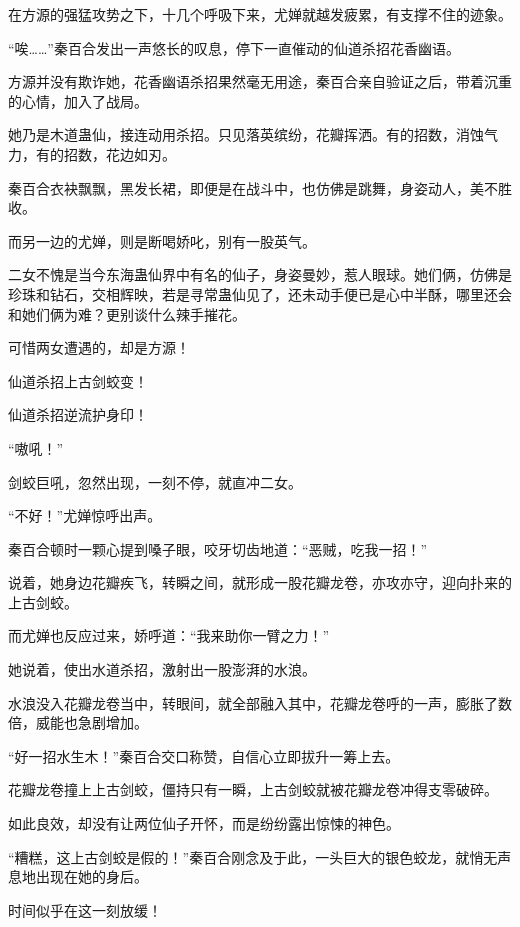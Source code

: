 
\begin{this_body}



在方源的强猛攻势之下，十几个呼吸下来，尤婵就越发疲累，有支撑不住的迹象。

“唉……”秦百合发出一声悠长的叹息，停下一直催动的仙道杀招花香幽语。

方源并没有欺诈她，花香幽语杀招果然毫无用途，秦百合亲自验证之后，带着沉重的心情，加入了战局。

她乃是木道蛊仙，接连动用杀招。只见落英缤纷，花瓣挥洒。有的招数，消蚀气力，有的招数，花边如刃。

秦百合衣袂飘飘，黑发长裙，即便是在战斗中，也仿佛是跳舞，身姿动人，美不胜收。

而另一边的尤婵，则是断喝娇叱，别有一股英气。

二女不愧是当今东海蛊仙界中有名的仙子，身姿曼妙，惹人眼球。她们俩，仿佛是珍珠和钻石，交相辉映，若是寻常蛊仙见了，还未动手便已是心中半酥，哪里还会和她们俩为难？更别谈什么辣手摧花。

可惜两女遭遇的，却是方源！

仙道杀招上古剑蛟变！

仙道杀招逆流护身印！

“嗷吼！”

剑蛟巨吼，忽然出现，一刻不停，就直冲二女。

“不好！”尤婵惊呼出声。

秦百合顿时一颗心提到嗓子眼，咬牙切齿地道：“恶贼，吃我一招！”

说着，她身边花瓣疾飞，转瞬之间，就形成一股花瓣龙卷，亦攻亦守，迎向扑来的上古剑蛟。

而尤婵也反应过来，娇呼道：“我来助你一臂之力！”

她说着，使出水道杀招，激射出一股澎湃的水浪。

水浪没入花瓣龙卷当中，转眼间，就全部融入其中，花瓣龙卷呼的一声，膨胀了数倍，威能也急剧增加。

“好一招水生木！”秦百合交口称赞，自信心立即拔升一筹上去。

花瓣龙卷撞上上古剑蛟，僵持只有一瞬，上古剑蛟就被花瓣龙卷冲得支零破碎。

如此良效，却没有让两位仙子开怀，而是纷纷露出惊悚的神色。

“糟糕，这上古剑蛟是假的！”秦百合刚念及于此，一头巨大的银色蛟龙，就悄无声息地出现在她的身后。

时间似乎在这一刻放缓！


\end{this_body}

